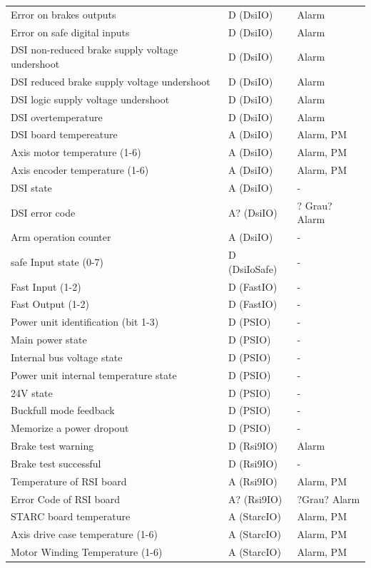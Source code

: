 \documentclass[ a4paper,
                oneside,
                toc=bibliography,
                toc=listof
                ]{scrbook}
\begin{document}
\begin{longtable}{|p{7cm}|p{3cm}|p{3cm}|}
		Error on brakes outputs & D (DsiIO) & Alarm \\
		Error on safe digital inputs & D (DsiIO) & Alarm \\
		DSI non-reduced brake supply voltage undershoot & D (DsiIO) & Alarm \\
		DSI reduced brake supply voltage undershoot & D (DsiIO) & Alarm \\
		DSI logic supply voltage undershoot & D (DsiIO) & Alarm \\
		DSI overtemperature & D (DsiIO) & Alarm \\
		\hline
		DSI board tempereature & A (DsiIO) & Alarm, PM \\
		Axis motor temperature (1-6) & A (DsiIO) & Alarm, PM \\
		Axis encoder temperature (1-6) & A (DsiIO) & Alarm, PM \\
		DSI state & A (DsiIO) & - \\
		DSI error code & A? (DsiIO) & ? Grau? Alarm \\
		Arm operation counter & A (DsiIO) & - \\
		\hline
		safe Input state (0-7) & D (DsiIoSafe) & - \\
		\hline
		Fast Input (1-2) & D (FastIO) & - \\
		Fast Output (1-2) & D (FastIO) & - \\
		\hline
		Power unit identification (bit 1-3) & D (PSIO) & - \\
		Main power state & D (PSIO) & - \\
		Internal bus voltage state & D (PSIO) & - \\
		Power unit internal temperature state & D (PSIO) & - \\
		24V state & D (PSIO) & - \\
		Buckfull mode feedback & D (PSIO) & - \\
		Memorize a power dropout & D (PSIO) & - \\
		\hline
		Brake test warning & D (Rsi9IO) & Alarm \\
		Brake test successful & D (Rsi9IO) & - \\
		Temperature of RSI board & A (Rsi9IO) & Alarm, PM \\
		Error Code of RSI board & A? (Rsi9IO) & ?Grau? Alarm \\
		\hline
		STARC board temperature & A (StarcIO) & Alarm, PM \\
		Axis drive case temperature (1-6) & A (StarcIO) & Alarm, PM \\
		Motor Winding Temperature (1-6) & A (StarcIO) & Alarm, PM \\

\end{longtable}
\end{document}

